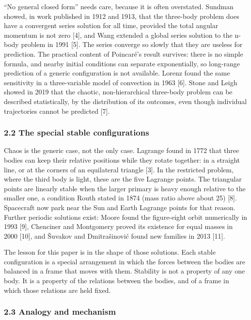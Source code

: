 \documentclass[
  10pt,
]{article}
\begin{document}
``No general closed form'' needs care, because it is often overstated.
Sundman showed, in work published in 1912 and 1913, that the three-body
problem does have a convergent series solution for all time, provided
the total angular momentum is not zero {[}4{]}, and Wang extended a
global series solution to the n-body problem in 1991 {[}5{]}. The series
converge so slowly that they are useless for prediction. The practical
content of Poincaré's result survives: there is no simple formula, and
nearby initial conditions can separate exponentially, so long-range
prediction of a generic configuration is not available. Lorenz found the
same sensitivity in a three-variable model of convection in 1963
{[}6{]}. Stone and Leigh showed in 2019 that the chaotic,
non-hierarchical three-body problem can be described statistically, by
the distribution of its outcomes, even though individual trajectories
cannot be predicted {[}7{]}.

\subsubsection{2.2 The special stable
configurations}\label{the-special-stable-configurations}

Chaos is the generic case, not the only case. Lagrange found in 1772
that three bodies can keep their relative positions while they rotate
together: in a straight line, or at the corners of an equilateral
triangle {[}3{]}. In the restricted problem, where the third body is
light, these are the five Lagrange points. The triangular points are
linearly stable when the larger primary is heavy enough relative to the
smaller one, a condition Routh stated in 1874 (mass ratio above about
25) {[}8{]}. Spacecraft now park near the Sun and Earth Lagrange points
for that reason. Further periodic solutions exist: Moore found the
figure-eight orbit numerically in 1993 {[}9{]}, Chenciner and Montgomery
proved its existence for equal masses in 2000 {[}10{]}, and Šuvakov and
Dmitrašinović found new families in 2013 {[}11{]}.

The lesson for this paper is in the shape of those solutions. Each
stable configuration is a special arrangement in which the forces
between the bodies are balanced in a frame that moves with them.
Stability is not a property of any one body. It is a property of the
relations between the bodies, and of a frame in which those relations
are held fixed.

\subsubsection{2.3 Analogy and mechanism}\label{analogy-and-mechanism}
\end{document}
